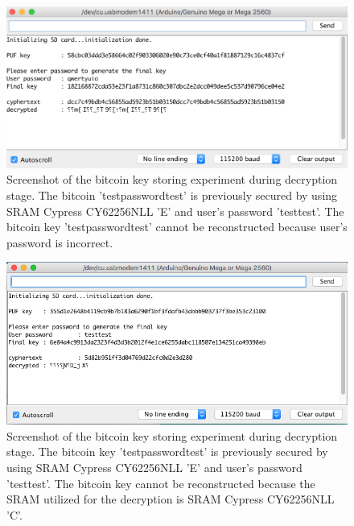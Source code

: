 \begin{figure}[tph!]
    \centerline{\includegraphics[width={\textwidth}]{images/E_decrypt_wrong_password}}
    \caption{Screenshot of the bitcoin key storing experiment during decryption stage. The bitcoin 'testpasswordtest' is previously secured by using SRAM Cypress CY62256NLL 'E' and user's password 'testtest'.
    The bitcoin key 'testpasswordtest' cannot be reconstructed because user's password is incorrect.}
    \label{fig:E_decrypt_wrong_password}
\end{figure}

\begin{figure}[tph!]
    \centerline{\includegraphics[width={\textwidth}]{images/E_decrypt_wrong_SRAM_C}}
    \caption{Screenshot of the bitcoin key storing experiment during decryption stage. The bitcoin key 'testpasswordtest' is previously secured by using SRAM Cypress CY62256NLL 'E' and user's password 'testtest'.
    The bitcoin key cannot be reconstructed because the SRAM utilized for the decryption is SRAM Cypress CY62256NLL 'C'.}
    \label{fig:E_decrypt_wrong_SRAM}
\end{figure}

